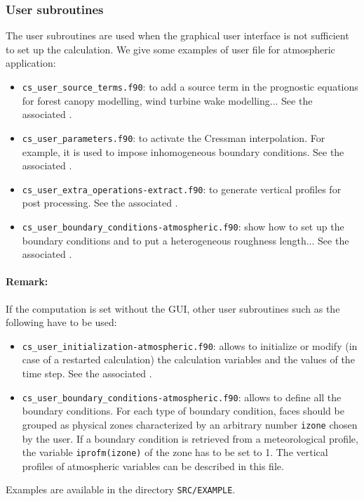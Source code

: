 {{\subsubsection{User subroutines}
%
The user subroutines are used when the graphical user interface is not
sufficient to set up the calculation. We give some examples of user file for
atmospheric application:
\begin{itemize}
\item \texttt{cs\_user\_source\_terms.f90}: to add a source term in the
prognostic equations for forest canopy modelling, wind turbine wake modelling...
See the associated .
\item \texttt{cs\_user\_parameters.f90}: to activate the Cressman interpolation.
For example, it is used to impose inhomogeneous boundary conditions. See the associated
.
\item \texttt{cs\_user\_extra\_operations-extract.f90}: to generate vertical
profiles for post processing. See the associated
.
\item \texttt{cs\_user\_boundary\_conditions-atmospheric.f90}: show how to set
up the boundary conditions and to put a heterogeneous roughness length...
See the associated .
\end{itemize}
%
\paragraph{Remark:}
If the computation is set without the GUI, other user subroutines such as the
following have to be used:
\begin{itemize}
\item \texttt{cs\_user\_initialization-atmospheric.f90}: allows to initialize
or modify (in case of a restarted calculation) the calculation variables and
the values of the time step. See the associated
.

\item \texttt{cs\_user\_boundary\_conditions-atmospheric.f90}: allows to define
all the boundary conditions. For each type of boundary condition, faces should
be grouped as physical zones characterized by an arbitrary number \texttt{izone}
chosen by the user. If a boundary condition is retrieved from a meteorological
profile, the variable \texttt{iprofm(izone)} of the zone has to be set to 1.
The vertical profiles of atmospheric variables can be described in this file.
\end{itemize}
%
Examples are available in the directory \texttt{SRC/EXAMPLE}.
%
}}
